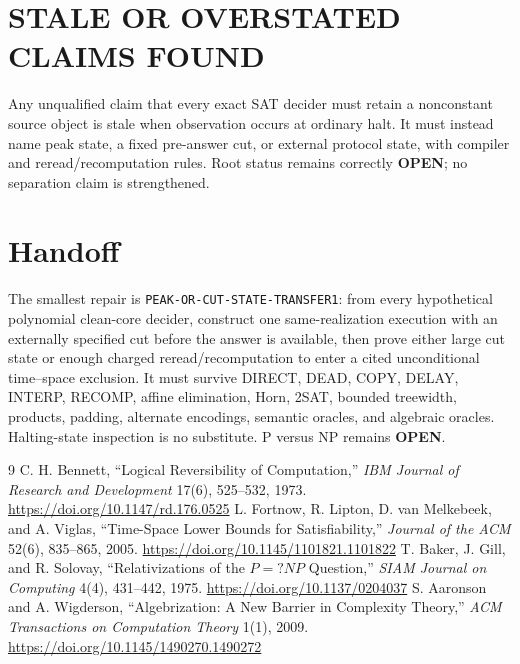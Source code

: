 \documentclass[11pt]{article}
\newcommand{\OPEN}{\textbf{OPEN}}
\begin{document}
\section{STALE OR OVERSTATED CLAIMS FOUND}
Any unqualified claim that every exact SAT decider must retain a nonconstant
source object is stale when observation occurs at ordinary halt. It must
instead name peak state, a fixed pre-answer cut, or external protocol state,
with compiler and reread/recomputation rules. Root status remains correctly
\OPEN; no separation claim is strengthened.

\section{Handoff}
The smallest repair is \texttt{PEAK-OR-CUT-STATE-TRANSFER1}: from every
hypothetical polynomial clean-core decider, construct one same-realization
execution with an externally specified cut before the answer is available,
then prove either large cut state or enough charged reread/recomputation to
enter a cited unconditional time--space exclusion. It must survive DIRECT,
DEAD, COPY, DELAY, INTERP, RECOMP, affine elimination, Horn, 2SAT, bounded
treewidth, products, padding, alternate encodings, semantic oracles, and
algebraic oracles. Halting-state inspection is no substitute. P versus NP
remains \OPEN.

\begin{thebibliography}{9}
C. H. Bennett, ``Logical Reversibility of Computation,''
\emph{IBM Journal of Research and Development} 17(6), 525--532, 1973.
\url{https://doi.org/10.1147/rd.176.0525}
L. Fortnow, R. Lipton, D. van Melkebeek, and A. Viglas,
``Time-Space Lower Bounds for Satisfiability,''
\emph{Journal of the ACM} 52(6), 835--865, 2005.
\url{https://doi.org/10.1145/1101821.1101822}
T. Baker, J. Gill, and R. Solovay,
``Relativizations of the \(P=?NP\) Question,''
\emph{SIAM Journal on Computing} 4(4), 431--442, 1975.
\url{https://doi.org/10.1137/0204037}
S. Aaronson and A. Wigderson,
``Algebrization: A New Barrier in Complexity Theory,''
\emph{ACM Transactions on Computation Theory} 1(1), 2009.
\url{https://doi.org/10.1145/1490270.1490272}
\end{thebibliography}

\end{document}
